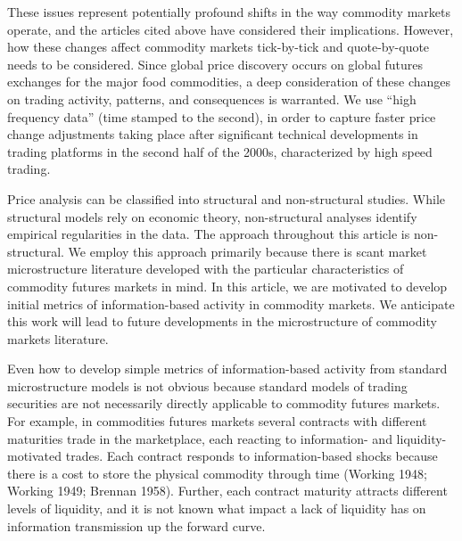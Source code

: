 \documentclass[]{elsarticle} %
\begin{document}
These issues represent potentially profound shifts in the way commodity
markets operate, and the articles cited above have considered their
implications. However, how these changes affect commodity markets
tick-by-tick and quote-by-quote needs to be considered. Since global
price discovery occurs on global futures exchanges for the major food
commodities, a deep consideration of these changes on trading activity,
patterns, and consequences is warranted. We use ``high frequency data''
(time stamped to the second), in order to capture faster price change
adjustments taking place after significant technical developments in
trading platforms in the second half of the 2000s, characterized by high
speed trading.

Price analysis can be classified into structural and non-structural
studies. While structural models rely on economic theory, non-structural
analyses identify empirical regularities in the data. The approach
throughout this article is non-structural. We employ this approach
primarily because there is scant market microstructure literature
developed with the particular characteristics of commodity futures
markets in mind. In this article, we are motivated to develop initial
metrics of information-based activity in commodity markets. We
anticipate this work will lead to future developments in the
microstructure of commodity markets literature.

Even how to develop simple metrics of information-based activity from
standard microstructure models is not obvious because standard models of
trading securities are not necessarily directly applicable to commodity
futures markets. For example, in commodities futures markets several
contracts with different maturities trade in the marketplace, each
reacting to information- and liquidity-motivated trades. Each contract
responds to information-based shocks because there is a cost to store
the physical commodity through time (Working 1948; Working 1949; Brennan
1958). Further, each contract maturity attracts different levels of
liquidity, and it is not known what impact a lack of liquidity has on
information transmission up the forward curve.
\end{document}
